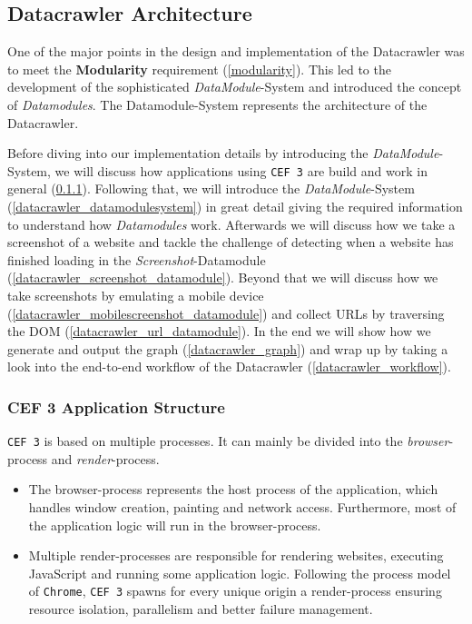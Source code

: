 \subsection{Datacrawler Architecture}
\label{datacrawler_architecture}
One of the major points in the design and implementation of the Datacrawler was to meet the \textbf{Modularity} requirement (\ref{modularity}). This led to the development of the sophisticated \textit{DataModule}-System and introduced the concept of \textit{Datamodules}. The Datamodule-System represents the architecture of the Datacrawler. 

Before diving into our implementation details by introducing the \textit{DataModule}-System, we will discuss how applications using \texttt{CEF 3} are build and work in general (\ref{datacrawler_cef_architecture}). Following that, we will introduce the \textit{DataModule}-System (\ref{datacrawler_datamodulesystem}) in great detail giving the required information to understand how \textit{Datamodules} work. Afterwards we will discuss how we take a screenshot of a website and tackle the challenge of detecting when a website has finished loading in the \textit{Screenshot}-Datamodule (\ref{datacrawler_screenshot_datamodule}). Beyond that we will discuss how we take screenshots by emulating a mobile device (\ref{datacrawler_mobilescreenshot_datamodule}) and collect URLs by traversing the DOM (\ref{datacrawler_url_datamodule}). In the end we will show how we generate and output the graph (\ref{datacrawler_graph}) and wrap up by taking a look into the end-to-end workflow of the Datacrawler (\ref{datacrawler_workflow}). 

\subsubsection{CEF 3 Application Structure}
\label{datacrawler_cef_architecture}
\texttt{CEF 3} is based on multiple processes. It can mainly be divided into the \textit{browser}-process and \textit{render}-process.

\begin{itemize}
\item The browser-process represents the host process of the application, which handles window creation, painting and network access. Furthermore, most of the application logic will run in the browser-process. 
\item Multiple render-processes are responsible for rendering websites, executing JavaScript and running some application logic. Following the process model of \texttt{Chrome}, \texttt{CEF 3} spawns for every unique origin a render-process ensuring resource isolation, parallelism and better failure management.
\end{itemize}

